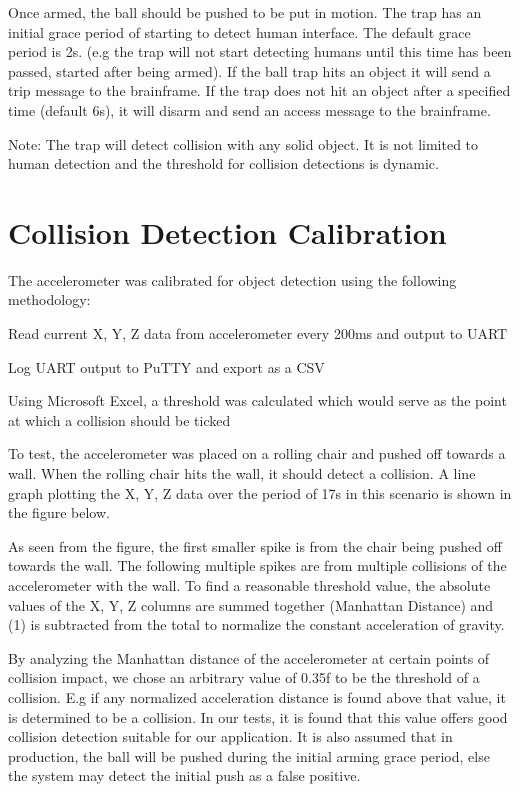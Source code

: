 Once armed, the ball should be pushed to be put in motion. The trap has an initial grace period of starting to detect human interface. The default grace period is 2s. (e.\+g the trap will not start detecting humans until this time has been passed, started after being armed). If the ball trap hits an object it will send a trip message to the brainframe. If the trap does not hit an object after a specified time (default 6s), it will disarm and send an access message to the brainframe.

Note\+: The trap will detect collision with any solid object. It is not limited to human detection and the threshold for collision detections is dynamic.\hypertarget{index_collision_detection}{}\section{Collision Detection Calibration}\label{index_collision_detection}
The accelerometer was calibrated for object detection using the following methodology\+:
\begin{DoxyItemize}
\item Read current X, Y, Z data from accelerometer every 200ms and output to U\+A\+RT
\item Log U\+A\+RT output to Pu\+T\+TY and export as a C\+SV
\item Using Microsoft Excel, a threshold was calculated which would serve as the point at which a collision should be ticked
\end{DoxyItemize}

To test, the accelerometer was placed on a rolling chair and pushed off towards a wall. When the rolling chair hits the wall, it should detect a collision. A line graph plotting the X, Y, Z data over the period of 17s in this scenario is shown in the figure below. 

As seen from the figure, the first smaller spike is from the chair being pushed off towards the wall. The following multiple spikes are from multiple collisions of the accelerometer with the wall. To find a reasonable threshold value, the absolute values of the X, Y, Z columns are summed together (Manhattan Distance) and (1) is subtracted from the total to normalize the constant acceleration of gravity. 
\begin{DoxyCode}{0}
\end{DoxyCode}
 By analyzing the Manhattan distance of the accelerometer at certain points of collision impact, we chose an arbitrary value of 0.\+35f to be the threshold of a collision. E.\+g if any normalized acceleration distance is found above that value, it is determined to be a collision. In our tests, it is found that this value offers good collision detection suitable for our application. It is also assumed that in production, the ball will be pushed during the initial arming grace period, else the system may detect the initial push as a false positive.

